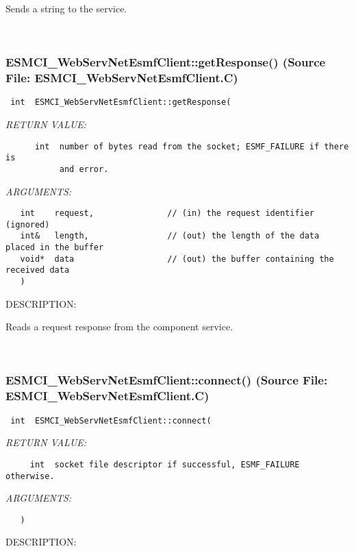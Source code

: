       Sends a string to the service.
   
 
\mbox{}\hrulefill\
 
\subsubsection{ESMCI\_WebServNetEsmfClient::getResponse() (Source File: ESMCI\_WebServNetEsmfClient.C)}


  
\begin{verbatim} int  ESMCI_WebServNetEsmfClient::getResponse(\end{verbatim}{\em RETURN VALUE:}
\begin{verbatim}      int  number of bytes read from the socket; ESMF_FAILURE if there is
           and error.\end{verbatim}{\em ARGUMENTS:}
\begin{verbatim}   int    request,               // (in) the request identifier (ignored)
   int&   length,                // (out) the length of the data placed in the buffer
   void*  data                   // (out) the buffer containing the received data
   )\end{verbatim}
{\sf DESCRIPTION:\\ }


      Reads a request response from the component service.
   
 
\mbox{}\hrulefill\
 
\subsubsection{ESMCI\_WebServNetEsmfClient::connect() (Source File: ESMCI\_WebServNetEsmfClient.C)}


  
\begin{verbatim} int  ESMCI_WebServNetEsmfClient::connect(\end{verbatim}{\em RETURN VALUE:}
\begin{verbatim}     int  socket file descriptor if successful, ESMF_FAILURE otherwise.\end{verbatim}{\em ARGUMENTS:}
\begin{verbatim}   )\end{verbatim}
{\sf DESCRIPTION:\\ }


